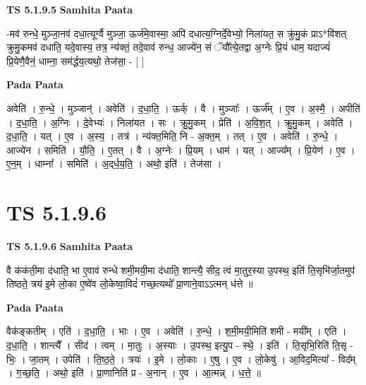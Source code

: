 \documentclass[17pt]{extarticle}
\begin{document}
\textbf{TS 5.1.9.5 } \newline
\textbf{Samhita Paata} \newline

-मव॑ रुन्धे॒ मुञ्जा॒नव॑ दधा॒त्यूर्ग्वै मुञ्जा॒ ऊर्ज॑मे॒वास्मा॒ अपि॑ दधात्य॒ग्निर्दे॒वेभ्यो॒ निला॑यत॒ स क्रु॑मु॒कं प्राऽ*वि॑शत् क्रुमु॒कमव॑ दधाति॒ यदे॒वास्य॒ तत्र॒ न्य॑क्तं॒ तदे॒वाव॑ रुन्ध॒ आज्ये॑न॒ सं ॅयौ᳚त्ये॒तद्वा अ॒ग्नेः प्रि॒यं धाम॒ यदाज्यं॑ प्रि॒येणै॒वैनं॒ धाम्ना॒ सम॑र्द्धय॒त्यथो॒ तेज॑सा॒ - [  ] \newline

\textbf{Pada Paata} \newline

अवेति॑ । रु॒न्धे॒ । मुञ्जान्॑ । अवेति॑ । द॒धा॒ति॒ । ऊर्क् । वै । मुञ्जाः᳚ । ऊर्ज᳚म् । ए॒व । अ॒स्मै॒ । अपीति॑ । द॒धा॒ति॒ । अ॒ग्निः । दे॒वेभ्यः॑ । निला॑यत । सः । क्रु॒मु॒कम् । प्रेति॑ । अ॒वि॒श॒त् । क्रु॒मु॒कम् । अवेति॑ । द॒धा॒ति॒ । यत् । ए॒व । अ॒स्य॒ । तत्र॑ । न्य॑क्त॒मिति॒ नि - अ॒क्त॒म् । तत् । ए॒व । अवेति॑ । रु॒न्धे॒ । आज्ये॑न । समिति॑ । यौ॒ति॒ । ए॒तत् । वै । अ॒ग्नेः । प्रि॒यम् । धाम॑ । यत् । आज्य᳚म् । प्रि॒येण॑ । ए॒व । ए॒न॒म् । धाम्ना᳚ । समिति॑ । अ॒द्‌र्ध॒य॒ति॒ । अथो॒ इति॑ । तेज॑सा ।  \newline




\section*{ TS 5.1.9.6 }

\textbf{TS 5.1.9.6 } \newline
\textbf{Samhita Paata} \newline

वै क॑कंती॒मा द॑धाति॒ भा ए॒वाव॑ रुन्धे शमी॒मयी॒मा द॑धाति॒ शान्त्यै॒ सीद॒ त्वं मा॒तुर॒स्या उ॒पस्थ॒ इति॑ ति॒सृभि॑र्जा॒तमुप॑ तिष्ठते॒ त्रय॑ इ॒मे लो॒का ए॒ष्वे॑व लो॒केष्वा॒विदं॑ गच्छ॒त्यथो᳚ प्रा॒णाने॒वाऽऽत्मन् ध॑त्ते ॥ \newline

\textbf{Pada Paata} \newline

वैक॑ङ्कतीम् । एति॑ । द॒धा॒ति॒ । भाः । ए॒व । अवेति॑ । रु॒न्धे॒ । श॒मी॒मयी॒मिति॑ शमी - मयी᳚म् । एति॑ । द॒धा॒ति॒ । शान्त्यै᳚ । सीद॑ । त्वम् । मा॒तुः । अ॒स्याः । उ॒पस्थ॒ इत्यु॒प - स्थे॒ । इति॑ । ति॒सृभि॒रिति॑ ति॒सृ - भिः॒ । जा॒तम् । उपेति॑ । ति॒ष्ठ॒ते॒ । त्रयः॑ । इ॒मे । लो॒काः । ए॒षु । ए॒व । लो॒केषु॑ । आ॒विद॒मित्या᳚ - विद᳚म् । ग॒च्छ॒ति॒ । अथो॒ इति॑ । प्रा॒णानिति॑ प्र - अ॒नान् । ए॒व । आ॒त्मन्न् । ध॒त्ते॒ ॥  \newline
\end{document}
